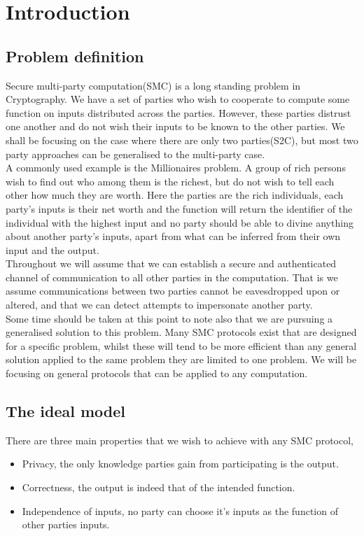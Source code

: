 \documentclass[a4paper,11pt]{article}
\begin{document}
	\section{Introduction}
		\subsection{Problem definition} \label{InformalProbDef}
			Secure multi-party computation(SMC) is a long standing problem in Cryptography. We have a set of parties who wish to cooperate to compute some function on inputs distributed across the parties. However, these parties distrust one another and do not wish their inputs to be known to the other parties. We shall be focusing on the case where there are only two parties(S2C), but most two party approaches can be generalised to the multi-party case.\\

			A commonly used example is the Millionaires problem. A group of rich persons wish to find out who among them is the richest, but do not wish to tell each other how much they are worth. Here the parties are the rich individuals, each party's inputs is their net worth and the function will return the identifier of the individual with the highest input and no party should be able to divine anything about another party's inputs, apart from what can be inferred from their own input and the output.\\

			Throughout we will assume that we can establish a secure and authenticated channel of communication to all other parties in the computation. That is we assume communications between two parties cannot be eavesdropped upon or altered, and that we can detect attempts to impersonate another party.\\

			Some time should be taken at this point to note also that we are pursuing a generalised solution to this problem. Many SMC protocols exist that are designed for a specific problem, whilst these will tend to be more efficient than any general solution applied to the same problem they are limited to one problem. We will be focusing on general protocols that can be applied to any computation.


		\subsection{The ideal model}
			There are three main properties that we wish to achieve with any SMC protocol,
			\begin{itemize}
				\item Privacy, the only knowledge parties gain from participating is the output.
				\item Correctness, the output is indeed that of the intended function.
				\item Independence of inputs, no party can choose it's inputs as the function of other parties inputs.
			\end{itemize}
\end{document}
